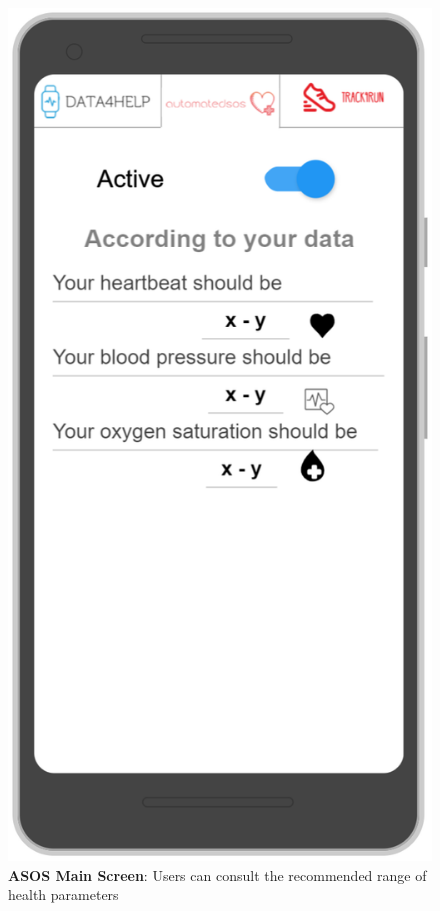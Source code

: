 \begin{figure}[H]
\centering
\includegraphics[scale = 0.5]{Mocks/Mobile_ASOS_Main.PNG}
\caption{\textbf{ASOS Main Screen}: Users can consult the recommended range of health parameters}
\end{figure}

